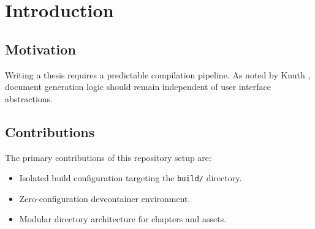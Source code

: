\chapter{Introduction}
\label{ch:introduction}

\section{Motivation}
Writing a thesis requires a predictable compilation pipeline. As noted by Knuth \cite{knuth1984texbook}, document generation logic should remain independent of user interface abstractions.

\section{Contributions}
The primary contributions of this repository setup are:
\begin{itemize}
    \item Isolated build configuration targeting the \texttt{build/} directory.
    \item Zero-configuration devcontainer environment.
    \item Modular directory architecture for chapters and assets.
\end{itemize}